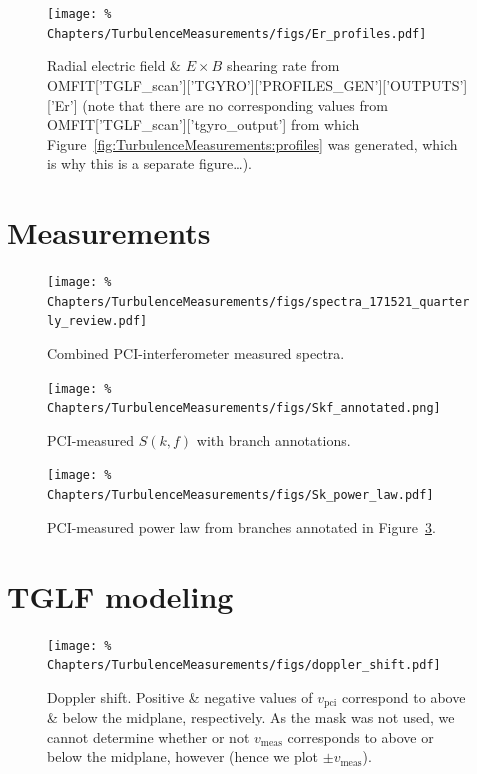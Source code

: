 \begin{figure}
  \centering
  \texttt{[image: \%
    Chapters/TurbulenceMeasurements/figs/Er\_profiles.pdf]}
  \caption[Radial electric field \& $E \times B$ shearing rate]{%
    Radial electric field \& $E \times B$ shearing rate from
    OMFIT['TGLF\_scan']['TGYRO']['PROFILES\_GEN']['OUTPUTS']['Er']
    (note that there are no corresponding values from
    OMFIT['TGLF\_scan']['tgyro\_output']
    from which Figure~\ref{fig:TurbulenceMeasurements:profiles}
    was generated, which is why this is a separate figure\ldots).
  }
\label{fig:TurbulenceMeasurements:Er_profiles}
\end{figure}


\section{Measurements}
\begin{figure}[h!]
  \centering
  \texttt{[image: \%
    Chapters/TurbulenceMeasurements/figs/spectra\_171521\_quarterly\_review.pdf]}
  \caption[Combined PCI-interferometer measured spectra]{%
    Combined PCI-interferometer measured spectra.
  }
\label{fig:TurbulenceMeasurements:spectra_quarterly_review}
\end{figure}

\begin{figure}[h!]
  \centering
  \texttt{[image: \%
    Chapters/TurbulenceMeasurements/figs/Skf\_annotated.png]}
  \caption[PCI-measured $S(k, f)$ with branch annotations]{%
    PCI-measured $S(k, f)$ with branch annotations.
  }
\label{fig:TurbulenceMeasurements:Skf_annotated}
\end{figure}

\begin{figure}[h!]
  \centering
  \texttt{[image: \%
    Chapters/TurbulenceMeasurements/figs/Sk\_power\_law.pdf]}
  \caption[PCI-measured power law]{%
    PCI-measured power law from branches annotated in
    Figure~\ref{fig:TurbulenceMeasurements:Skf_annotated}.
  }
\label{fig:TurbulenceMeasurements:Sk_power_law}
\end{figure}


\section{TGLF modeling}
\begin{figure}[h!]
  \centering
  \texttt{[image: \%
    Chapters/TurbulenceMeasurements/figs/doppler\_shift.pdf]}
  \caption[Doppler shift]{%
    Doppler shift. Positive \& negative values of $v_{\text{pci}}$
    correspond to above \& below the midplane, respectively.
    As the mask was not used, we cannot determine whether or not
    $v_{\text{meas}}$ corresponds to above or below the midplane, however
    (hence we plot $\pm v_{\text{meas}}$).
  }
\label{fig:TurbulenceMeasurements:doppler_shift}
\end{figure}

